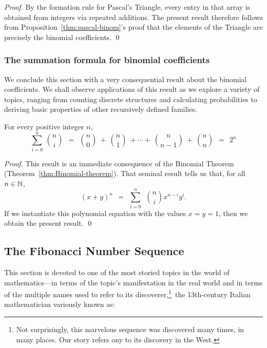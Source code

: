\begin{proof}
By the formation rule for Pascal's Triangle, every entry in that array
is obtained from integers via repeated additions.  The present result
therefore follows from Proposition~\ref{thm:pascal-binom}'s proof that
the elements of the Triangle are precisely the binomial coefficients.  \qed
\end{proof}


\subsubsection{The summation formula for binomial coefficients}
\label{sec:summaion-BinCoeff}

We conclude this section with a very consequential result about the
binomial coefficients.  We shall observe applications of this result
as we explore a variety of topics, ranging from counting discrete
structures and calculating probabilities to deriving basic properties
of other recursively defined families.


\begin{prop}
\label{thm:sumsof-binomcoeff}
For every positive integer $n$,
\[
\sum_{i=0}^n \ {n \choose i} \ \ = \ \
{n \choose 0} \ + \ {n \choose 1} \ + \cdots + \ {n \choose {n-1}} \ +
\ {n \choose n} \ \ = \ \ 2^n
\]
\end{prop}

\begin{proof}
This result is an immediate consequence of the Binomial Theorem
(Theorem~\ref{thm:Binomial-theorem}).  That seminal result tells us
that, for all $n \in \mathbb{N}$,
\[
(x+y)^n \ \ = \ \ \sum_{i=0}^n \ \ {n \choose i} x^{n-i} y^i.
\]
If we instantiate this polynomial equation with the values $x = y =
1$, then we obtain the present result.
\qed
\end{proof}


\subsection{The Fibonacci Number Sequence}
\label{sec:Fibonacci}

This section is devoted to one of the most storied topics in the world
of mathematics---in terms of the topic's manifestation in the real
world and in terms of the multiple names used to refer to its
discoverer,\footnote{Not surprisingly, this marvelous sequence was
  discovered many times, in many places.  Our story refers ony to its
  discovery in the West.}~the 13th-century Italian mathematician
variously known as: \index{Fibonacci, Leonardo}

